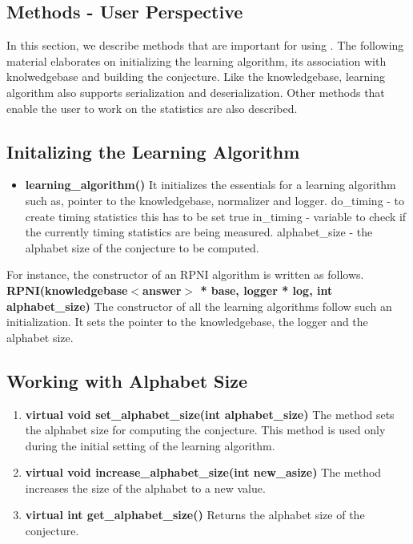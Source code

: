\subsection{Methods - User Perspective}

In this section, we describe methods that are important for using \libalf. The following material elaborates on initializing the learning algorithm, its association with knolwedgebase and building the conjecture. Like the knowledgebase, learning algorithm also supports serialization and deserialization. Other methods that enable the user to work on the statistics are also described.

\subsection*{Initalizing the Learning Algorithm}

\begin{itemize}
 \item \textbf{learning\_algorithm()} \vskip 1pt
	It initializes the essentials for a learning algorithm such as, pointer to the knowledgebase, normalizer and logger. 
	do\_timing - to create timing statistics this has to be set true
	in\_timing - variable to check if the currently timing statistics are being measured.
	alphabet\_size - the alphabet size of the conjecture to be computed.
\end{itemize}

For instance, the constructor of an RPNI algorithm is written as follows. \vskip 1pt
\textbf{RPNI(knowledgebase$<$answer$>$ * base, logger * log, int alphabet\_size)} \vskip 1pt
The constructor of all the learning algorithms follow such an initialization. It sets the pointer to the knowledgebase, the logger and the alphabet size. 

\subsection*{Working with Alphabet Size}

\begin{enumerate}
 \item \textbf{virtual void set\_alphabet\_size(int alphabet\_size)} \vskip 1pt
	The method sets the alphabet size for computing the conjecture. This method is used only during the initial setting of the learning algorithm. 

 \item \textbf{virtual void increase\_alphabet\_size(int new\_asize)} \vskip 1pt
	The method increases the size of the alphabet to a new value.

 \item \textbf{virtual int get\_alphabet\_size()} \vskip 1pt
	Returns the alphabet size of the conjecture.
\end{enumerate}

